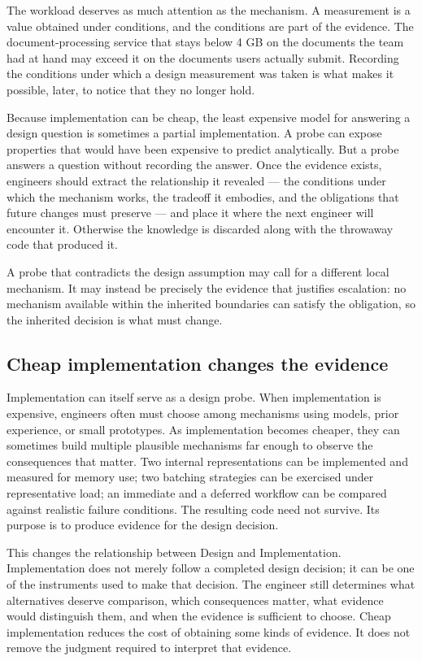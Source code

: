 The workload deserves as much attention as the mechanism. A measurement is a value obtained under
conditions, and the conditions are part of the evidence. The document-processing service that stays
below 4 GB on the documents the team had at hand may exceed it on the documents users actually
submit. Recording the conditions under which a design measurement was taken is what makes it
possible, later, to notice that they no longer hold.

Because implementation can be cheap, the least expensive model for answering a design question is
sometimes a partial implementation. A probe can expose properties that would have been expensive to
predict analytically. But a probe answers a question without recording the answer. Once the evidence
exists, engineers should extract the relationship it revealed --- the conditions under which the
mechanism works, the tradeoff it embodies, and the obligations that future changes must preserve ---
and place it where the next engineer will encounter it. Otherwise the knowledge is discarded along
with the throwaway code that produced it.

A probe that contradicts the design assumption may call for a different local mechanism. It may
instead be precisely the evidence that justifies escalation: no mechanism available within the
inherited boundaries can satisfy the obligation, so the inherited decision is what must change.

\subsection{Cheap implementation changes the evidence}\label{cheap-implementation-changes-the-evidence}

Implementation can itself serve as a design probe.
When implementation is expensive, engineers often must choose among mechanisms using models, prior experience, or small prototypes.
As implementation becomes cheaper, they can sometimes build multiple plausible mechanisms far enough to observe the consequences that matter.
Two internal representations can be implemented and measured for memory use; two batching strategies can be exercised under representative load; an immediate and a deferred workflow can be compared against realistic failure conditions.
The resulting code need not survive.
Its purpose is to produce evidence for the design decision.

This changes the relationship between Design and Implementation.
Implementation does not merely follow a completed design decision; it can be one of the instruments used to make that decision.
The engineer still determines what alternatives deserve comparison, which consequences matter, what evidence would distinguish them, and when the evidence is sufficient to choose.
Cheap implementation reduces the cost of obtaining some kinds of evidence.
It does not remove the judgment required to interpret that evidence.

